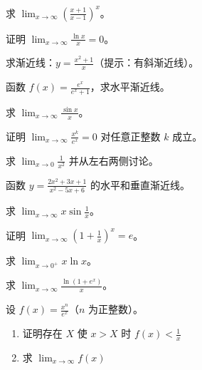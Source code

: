 \begin{exercise}[4]
求 \(\displaystyle\lim_{x\to\infty} \left(\frac{x+1}{x-1}\right)^x\)。
\end{exercise}
\begin{exercise}[4]
证明 \(\displaystyle\lim_{x\to\infty} \frac{\ln x}{x} = 0\)。
\end{exercise}
\begin{exercise}[4]
求渐近线：\(y=\frac{x^2+1}{x}\)（提示：有斜渐近线）。
\end{exercise}
\begin{exercise}[4]
函数 \(f(x)=\frac{e^x}{e^x+1}\)，求水平渐近线。
\end{exercise}
\begin{exercise}[4]
求 \(\displaystyle\lim_{x\to\infty} \frac{\sin x}{x}\)。
\end{exercise}

\begin{exercise}[5]
证明 \(\displaystyle\lim_{x\to\infty} \frac{x^k}{e^x}=0\) 对任意正整数 \(k\) 成立。
\end{exercise}
\begin{exercise}[5]
求 \(\displaystyle\lim_{x\to 0} \frac{1}{x^2}\) 并从左右两侧讨论。
\end{exercise}
\begin{exercise}[5]
函数 \(y=\frac{2x^2+3x+1}{x^2-5x+6}\) 的水平和垂直渐近线。
\end{exercise}
\begin{exercise}[5]
求 \(\displaystyle\lim_{x\to\infty} x\sin\frac{1}{x}\)。
\end{exercise}

\begin{exercise}[6]
证明 \(\displaystyle\lim_{x\to\infty} \left(1+\frac{1}{x}\right)^x = e\)。
\end{exercise}
\begin{exercise}[6]
求 \(\displaystyle\lim_{x\to 0^+} x\ln x\)。
\end{exercise}
\begin{exercise}[6]
求 \(\displaystyle\lim_{x\to\infty} \frac{\ln(1+e^x)}{x}\)。
\end{exercise}

\begin{exercise}[7]
设 \(f(x)=\frac{x^n}{e^x}\)（\(n\) 为正整数）。
\begin{enumerate}
  \item[(1)] 证明存在 \(X\) 使 \(x>X\) 时 \(f(x)<\frac{1}{x}\)
  \item[(2)] 求 \(\lim_{x\to\infty} f(x)\)
\end{enumerate}
\end{exercise}

